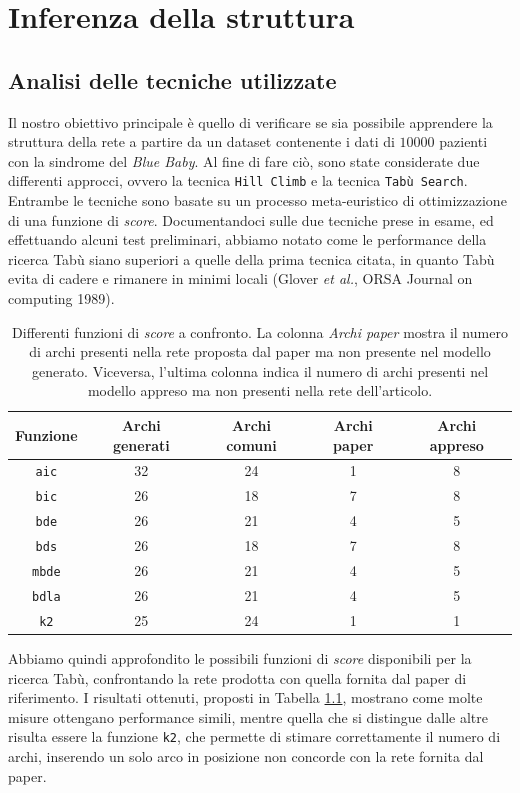 \chapter{Inferenza della struttura}
\section{Analisi delle tecniche utilizzate}
\label{sec:misure}
Il nostro obiettivo principale è quello di verificare se sia possibile apprendere la struttura della rete a partire da un dataset contenente i dati di $10000$ pazienti con la sindrome del \textit{Blue Baby}. Al fine di fare ciò, sono state considerate due differenti approcci, ovvero la tecnica \texttt{Hill Climb} e la tecnica \texttt{Tabù Search}. Entrambe le tecniche sono basate su un processo meta-euristico di ottimizzazione di una funzione di \textit{score}. Documentandoci sulle due tecniche prese in esame, ed effettuando alcuni test preliminari, abbiamo notato come le performance della ricerca Tabù siano superiori a quelle della prima tecnica citata, in quanto Tabù evita di cadere e rimanere in minimi locali (Glover \textit{et al.}, ORSA Journal on computing 1989).\\
\begin{table}[t!]
	\centering
	\caption{Differenti funzioni di \textit{score} a confronto. La colonna \textit{Archi paper} mostra il numero di archi presenti nella rete proposta dal paper ma non presente nel modello generato. Viceversa, l'ultima colonna indica il numero di archi presenti nel modello appreso ma non presenti nella rete dell'articolo.}
	\begin{tabular}{|c|c|c|c|c|}
		\hline 
		Funzione & Archi generati  & Archi comuni & Archi paper & Archi appreso \\ 
		\hline 
		\texttt{aic} & 32 & 24 & 1 & 8 \\ 
		\hline 
		\texttt{bic} & 26 & 18 & 7 & 8 \\ 
		\hline 
		\texttt{bde} & 26 & 21 & 4 & 5 \\ 
		\hline 
		\texttt{bds} & 26 & 18 & 7 & 8 \\ 
		\hline 
		\texttt{mbde} & 26 & 21 & 4 & 5 \\ 
		\hline 
		\texttt{bdla} & 26 & 21 & 4 & 5 \\ 
		\hline 
		\texttt{k2} & 25 & 24 & 1 & 1 \\ 
		\hline 
	\end{tabular} 
	\label{tab:score}
\end{table}
Abbiamo quindi approfondito le possibili funzioni di \textit{score} disponibili per la ricerca Tabù, confrontando la rete prodotta con quella fornita dal paper di riferimento. I risultati ottenuti, proposti in Tabella \ref{tab:score}, mostrano come molte misure ottengano performance simili, mentre quella che si distingue dalle altre risulta essere la funzione \texttt{k2}, che permette di stimare correttamente il numero di archi, inserendo un solo arco in posizione non concorde con la rete fornita dal paper.\\
